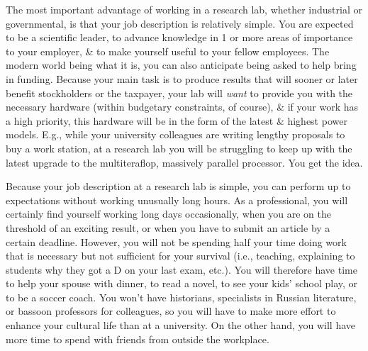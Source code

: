 \documentclass{article}
\begin{document}
\begin{enumerate}
\begin{itemize}
\begin{itemize}
			The most important advantage of working in a research lab, whether industrial or governmental, is that your job description is relatively simple. You are expected to be a scientific leader, to advance knowledge in 1 or more areas of importance to your employer, \& to make yourself useful to your fellow employees. The modern world being what it is, you can also anticipate being asked to help bring in funding. Because your main task is to produce results that will sooner or later benefit stockholders or the taxpayer, your lab will \textit{want} to provide you with the necessary hardware (within budgetary constraints, of course), \& if your work has a high priority, this hardware will be in the form of the latest \& highest power models. E.g., while your university colleagues are writing lengthy proposals to buy a work station, at a research lab you will be struggling to keep up with the latest upgrade to the multiteraflop, massively parallel processor. You get the idea.
			
			Because your job description at a research lab is simple, you can perform up to expectations without working unusually long hours. As a professional, you will certainly find yourself working long days occasionally, when you are on the threshold of an exciting result, or when you have to submit an article by a certain deadline. However, you will not be spending half your time doing work that is necessary but not sufficient for your survival (i.e., teaching, explaining to students why they got a D on your last exam, etc.). You will therefore have time to help your spouse with dinner, to read a novel, to see your kids' school play, or to be a soccer coach. You won't have historians, specialists in Russian literature, or bassoon professors for colleagues, so you will have to make more effort to enhance your cultural life than at a university. On the other hand, you will have more time to spend with friends from outside the workplace.
			

\end{itemize}
\end{itemize}
\end{enumerate}
\end{document}
